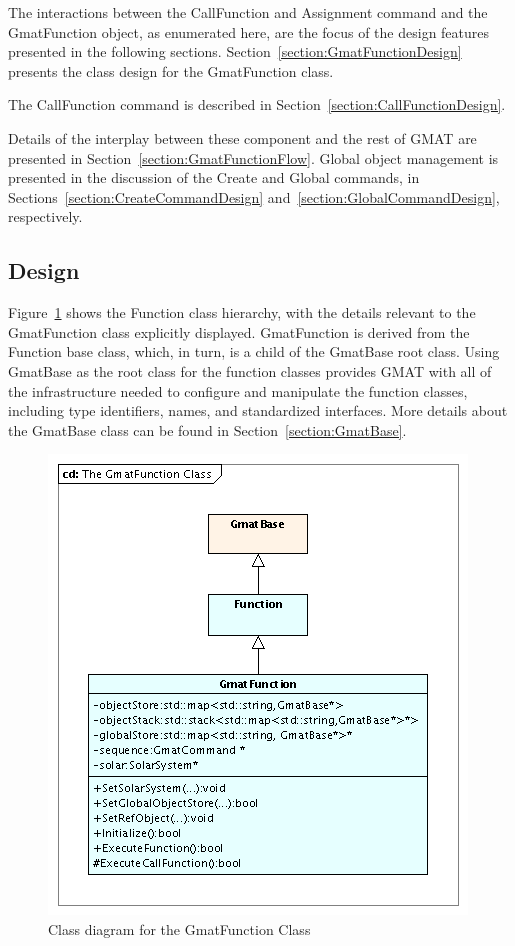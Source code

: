 The interactions between the CallFunction and Assignment command and the GmatFunction object, as
enumerated here, are the focus of the design features presented in the following sections.
Section~\ref{section:GmatFunctionDesign} presents the class design for the GmatFunction class.

The CallFunction command is described in Section~\ref{section:CallFunctionDesign}.

Details of the interplay between these component and the rest of GMAT are presented in
Section~\ref{section:GmatFunctionFlow}.  Global object management is presented in the discussion of
the Create and Global commands, in Sections~\ref{section:CreateCommandDesign}
and~\ref{section:GlobalCommandDesign}, respectively.

\subsection{\label{section:GmatFunctionDesign}Design}

Figure~\ref{figure:GmatFunctionClass} shows the Function class hierarchy, with the details relevant
to the GmatFunction class explicitly displayed.  GmatFunction is derived from the Function base
class, which, in turn, is a child of the GmatBase root class.  Using GmatBase as the root class for
the function classes provides GMAT with all of the infrastructure needed to configure and manipulate
the function classes, including type identifiers, names, and standardized interfaces.  More details
about the GmatBase class can be found in Section~\ref{section:GmatBase}.

\begin{figure}[htb]
\begin{center}
\includegraphics[210,231]{Images/TheGmatFunctionClass.png}
\caption{\label{figure:GmatFunctionClass}Class diagram for the GmatFunction Class}
\end{center}
\end{figure}

